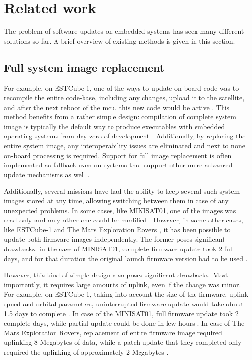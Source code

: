 \newpage
\section{Related work}

The problem of software updates on embedded systems has seen many different solutions so far. A brief overview of existing methods is given in this section.

\subsection{Full system image replacement}

For example, on ESTCube-1, one of the ways to update on-board code was to recompile the entire code-base, including any changes, upload it to the satellite, and after the next reboot of the \gls{mcu}, this new code would be active \cite{Suenter2016}. This method benefits from a rather simple design: compilation of complete system image is typically the default way to produce executables with embedded operating systems from day zero of development . Additionally, by replacing the entire system image, any interoperability issues are eliminated and next to none on-board processing is required. Support for full image replacement is often implemented as fallback even on systems that support other more advanced update mechanisms as well \cite{Tarbe2013,Greco2005,Garrido1998}.

Additionally, several missions have had the ability to keep several such system images stored at any time, allowing switching between them in case of any unexpected problems. In some cases, like MINISAT01, one of the images was read-only and only other one could be modified \cite{Garrido1998}. However, in some other cases, like  ESTCube-1 \cite{Tarbe2013} and The Mars Exploration Rovers \cite{Greco2005}, it has been possible to update both firmware images independently. The former poses significant drawbacks: in the case of MINISAT01, complete firmware update took 2 full days, and for that duration the original launch firmware version had to be used \cite{Garrido1998}. 


However, this kind of simple design also poses significant drawbacks. Most importantly, it requires large amounts of uplink, even if the change was minor. For example, on ESTCube-1, taking into account the size of the firmware, uplink speed and orbital parameters, uninterrupted firmware update would take about 1.5 days to complete \cite{Suenter2014}. In case of the MINISAT01, full firmware update took 2 complete days, while partial update could be done in few hours \cite{Garrido1998}. In case of The Mars Exploration Rovers, replacement of entire firmware image required uplinking 8 Megabytes of data, while a patch update that they completed only required the uplinking of approximately 2 Megabytes \cite{Greco2005}.

